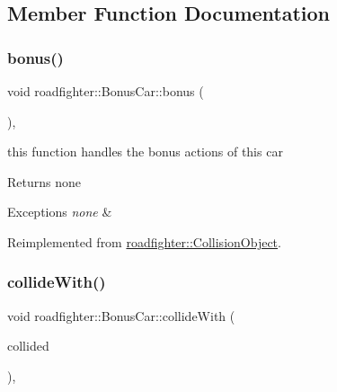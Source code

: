 \subsection{Member Function Documentation}
\mbox{\label{classroadfighter_1_1BonusCar_a3d2d15df036c419cd9ad4fbc6fcd4ad9}} 
\subsubsection{\texorpdfstring{bonus()}{bonus()}}
{\footnotesize\ttfamily void roadfighter\+::\+Bonus\+Car\+::bonus (\begin{DoxyParamCaption}{ }\end{DoxyParamCaption})\hspace{0.3cm}{\ttfamily [override]}, {\ttfamily [virtual]}}

this function handles the bonus actions of this car \begin{DoxyReturn}{Returns}
none 
\end{DoxyReturn}

\begin{DoxyExceptions}{Exceptions}
{\em none} & \\
\hline
\end{DoxyExceptions}


Reimplemented from \hyperlink{classroadfighter_1_1CollisionObject_ad35887bb3cfb8c054eaaee56306d6944}{roadfighter\+::\+Collision\+Object}.

\mbox{\label{classroadfighter_1_1BonusCar_ad1ce65b53e5652eac482a7b00c9a1d51}} 
\subsubsection{\texorpdfstring{collide\+With()}{collideWith()}}
{\footnotesize\ttfamily void roadfighter\+::\+Bonus\+Car\+::collide\+With (\begin{DoxyParamCaption}\item[{std\+::shared\+\_\+ptr$<$ \hyperlink{classroadfighter_1_1CollisionObject}{Collision\+Object} $>$ \&}]{collided }\end{DoxyParamCaption})\hspace{0.3cm}{\ttfamily [override]}, {\ttfamily [virtual]}}

